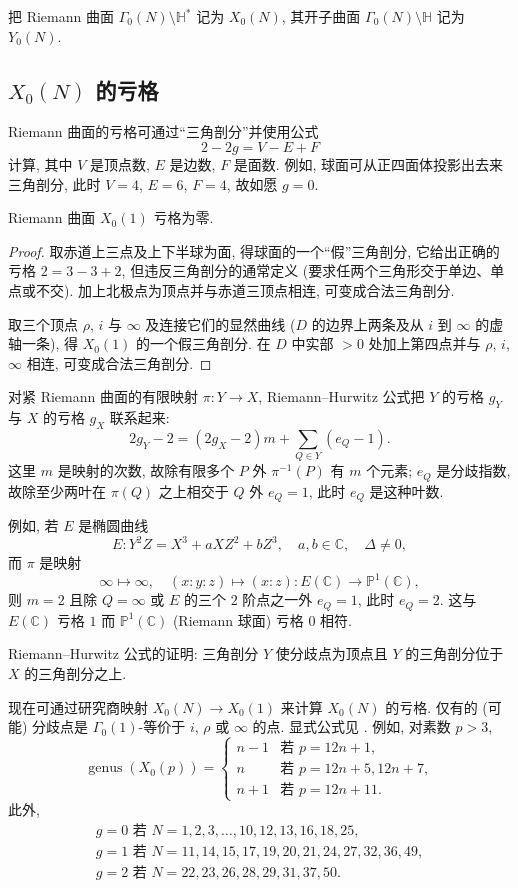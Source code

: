 把 Riemann 曲面 $\Gamma_0(N)\setminus\mathbb{H}^*$ 记为 $X_0(N)$, 其开子曲面 $\Gamma_0(N)\setminus\mathbb{H}$ 记为 $Y_0(N)$.

\subsection*{$X_0(N)$ 的亏格}

Riemann 曲面的亏格可通过``三角剖分''并使用公式
\[
2 - 2g = V - E + F
\]
计算, 其中 $V$ 是顶点数, $E$ 是边数, $F$ 是面数. 例如, 球面可从正四面体投影出去来三角剖分, 此时 $V = 4$, $E = 6$, $F = 4$, 故如愿 $g = 0$.

\begin{proposition} \label{thm:5.1.9}
Riemann 曲面 $X_0(1)$ 亏格为零.
\end{proposition}

\begin{proof}
取赤道上三点及上下半球为面, 得球面的一个``假''三角剖分, 它给出正确的亏格 $2 = 3 - 3 + 2$, 但违反三角剖分的通常定义 (要求任两个三角形交于单边、单点或不交). 加上北极点为顶点并与赤道三顶点相连, 可变成合法三角剖分.

取三个顶点 $\rho$, $i$ 与 $\infty$ 及连接它们的显然曲线 ($D$ 的边界上两条及从 $i$ 到 $\infty$ 的虚轴一条), 得 $X_0(1)$ 的一个假三角剖分. 在 $D$ 中实部 $> 0$ 处加上第四点并与 $\rho$, $i$, $\infty$ 相连, 可变成合法三角剖分.
\end{proof}

对紧 Riemann 曲面的有限映射 $\pi\colon Y\to X$, Riemann--Hurwitz 公式把 $Y$ 的亏格 $g_Y$ 与 $X$ 的亏格 $g_X$ 联系起来:
\[
2g_Y - 2 = (2g_X - 2)m + \sum_{Q\in Y}(e_Q - 1).
\]
这里 $m$ 是映射的次数, 故除有限多个 $P$ 外 $\pi^{-1}(P)$ 有 $m$ 个元素; $e_Q$ 是分歧指数, 故除至少两叶在 $\pi(Q)$ 之上相交于 $Q$ 外 $e_Q = 1$, 此时 $e_Q$ 是这种叶数.

例如, 若 $E$ 是椭圆曲线
\[
E\colon Y^2Z = X^3 + aXZ^2 + bZ^3, \quad a,b\in\mathbb{C}, \quad\Delta\neq 0,
\]
而 $\pi$ 是映射
\[
\infty\mapsto\infty, \quad (x:y:z)\mapsto(x:z)\colon E(\mathbb{C})\to\mathbb{P}^1(\mathbb{C}),
\]
则 $m = 2$ 且除 $Q = \infty$ 或 $E$ 的三个 $2$ 阶点之一外 $e_Q = 1$, 此时 $e_Q = 2$. 这与 $E(\mathbb{C})$ 亏格 $1$ 而 $\mathbb{P}^1(\mathbb{C})$ (Riemann 球面) 亏格 $0$ 相符.

Riemann--Hurwitz 公式的证明: 三角剖分 $Y$ 使分歧点为顶点且 $Y$ 的三角剖分位于 $X$ 的三角剖分之上.

现在可通过研究商映射 $X_0(N)\to X_0(1)$ 来计算 $X_0(N)$ 的亏格. 仅有的 (可能) 分歧点是 $\Gamma_0(1)$-等价于 $i$, $\rho$ 或 $\infty$ 的点. 显式公式见 \cite[pp.~23--25]{shimura1971}. 例如, 对素数 $p > 3$,
\[
\operatorname{genus}(X_0(p)) = \begin{cases} n - 1 & \text{若 } p = 12n + 1,\\ n & \text{若 } p = 12n + 5, 12n + 7,\\ n + 1 & \text{若 } p = 12n + 11.\end{cases}
\]
此外,
\begin{gather*}
g = 0 \text{ 若 } N = 1, 2, 3, \dots, 10, 12, 13, 16, 18, 25,\\
g = 1 \text{ 若 } N = 11, 14, 15, 17, 19, 20, 21, 24, 27, 32, 36, 49,\\
g = 2 \text{ 若 } N = 22, 23, 26, 28, 29, 31, 37, 50.
\end{gather*}

